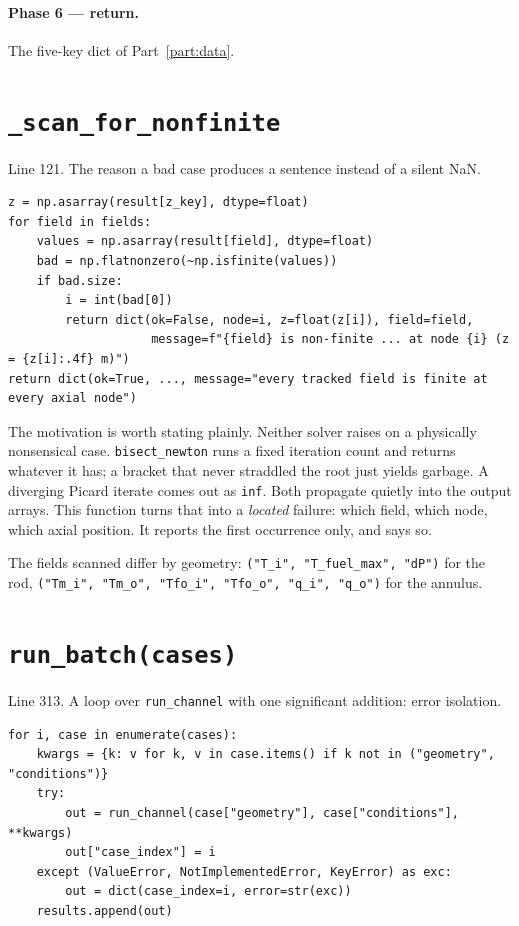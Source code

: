 \documentclass[11pt]{article}
\newcommand{\code}[1]{\texttt{#1}}
\begin{document}
\paragraph{Phase 6 --- return.} The five-key dict of Part~\ref{part:data}.

\section{\code{\_scan\_for\_nonfinite}}
Line 121. The reason a bad case produces a sentence instead of a silent NaN.

\begin{lstlisting}
z = np.asarray(result[z_key], dtype=float)
for field in fields:
    values = np.asarray(result[field], dtype=float)
    bad = np.flatnonzero(~np.isfinite(values))
    if bad.size:
        i = int(bad[0])
        return dict(ok=False, node=i, z=float(z[i]), field=field,
                    message=f"{field} is non-finite ... at node {i} (z = {z[i]:.4f} m)")
return dict(ok=True, ..., message="every tracked field is finite at every axial node")
\end{lstlisting}

The motivation is worth stating plainly. Neither solver raises on a physically
nonsensical case. \code{bisect\_newton} runs a fixed iteration count and returns
whatever it has; a bracket that never straddled the root just yields garbage. A diverging
Picard iterate comes out as \code{inf}. Both propagate quietly into the output arrays.
This function turns that into a \emph{located} failure: which field, which node, which
axial position. It reports the first occurrence only, and says so.

The fields scanned differ by geometry: \code{("T\_i", "T\_fuel\_max", "dP")} for the rod,
\code{("Tm\_i", "Tm\_o", "Tfo\_i", "Tfo\_o", "q\_i", "q\_o")} for the annulus.

\section{\code{run\_batch(cases)}}
Line 313. A loop over \code{run\_channel} with one significant addition: error isolation.

\begin{lstlisting}
for i, case in enumerate(cases):
    kwargs = {k: v for k, v in case.items() if k not in ("geometry", "conditions")}
    try:
        out = run_channel(case["geometry"], case["conditions"], **kwargs)
        out["case_index"] = i
    except (ValueError, NotImplementedError, KeyError) as exc:
        out = dict(case_index=i, error=str(exc))
    results.append(out)
\end{lstlisting}
\end{document}

